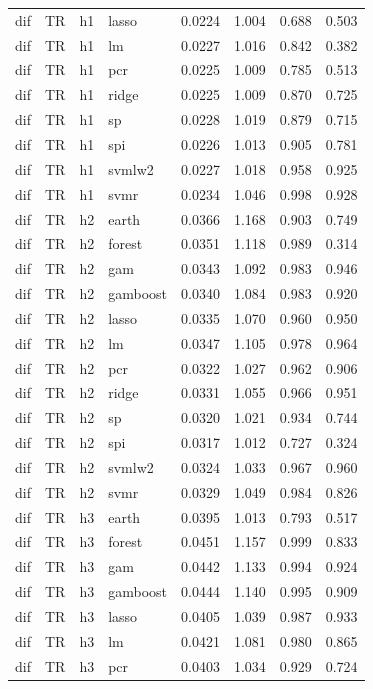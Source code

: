\begin{ThreePartTable}
\begin{longtable}[t]{llclcccc}
dif & TR & h1 & lasso & 0.0224 & 1.004 & 0.688 & 0.503\\
dif & TR & h1 & lm & 0.0227 & 1.016 & 0.842 & 0.382\\
dif & TR & h1 & pcr & 0.0225 & 1.009 & 0.785 & 0.513\\
dif & TR & h1 & ridge & 0.0225 & 1.009 & 0.870 & 0.725\\
dif & TR & h1 & sp & 0.0228 & 1.019 & 0.879 & 0.715\\
dif & TR & h1 & spi & 0.0226 & 1.013 & 0.905 & 0.781\\
dif & TR & h1 & svmlw2 & 0.0227 & 1.018 & 0.958 & 0.925\\
dif & TR & h1 & svmr & 0.0234 & 1.046 & 0.998 & 0.928\\
\addlinespace
dif & TR & h2 & earth & 0.0366 & 1.168 & 0.903 & 0.749\\
dif & TR & h2 & forest & 0.0351 & 1.118 & 0.989 & 0.314\\
dif & TR & h2 & gam & 0.0343 & 1.092 & 0.983 & 0.946\\
dif & TR & h2 & gamboost & 0.0340 & 1.084 & 0.983 & 0.920\\
dif & TR & h2 & lasso & 0.0335 & 1.070 & 0.960 & 0.950\\
dif & TR & h2 & lm & 0.0347 & 1.105 & 0.978 & 0.964\\
dif & TR & h2 & pcr & 0.0322 & 1.027 & 0.962 & 0.906\\
dif & TR & h2 & ridge & 0.0331 & 1.055 & 0.966 & 0.951\\
dif & TR & h2 & sp & 0.0320 & 1.021 & 0.934 & 0.744\\
dif & TR & h2 & spi & 0.0317 & 1.012 & 0.727 & 0.324\\
dif & TR & h2 & svmlw2 & 0.0324 & 1.033 & 0.967 & 0.960\\
dif & TR & h2 & svmr & 0.0329 & 1.049 & 0.984 & 0.826\\
\addlinespace
dif & TR & h3 & earth & 0.0395 & 1.013 & 0.793 & 0.517\\
dif & TR & h3 & forest & 0.0451 & 1.157 & 0.999 & 0.833\\
dif & TR & h3 & gam & 0.0442 & 1.133 & 0.994 & 0.924\\
dif & TR & h3 & gamboost & 0.0444 & 1.140 & 0.995 & 0.909\\
dif & TR & h3 & lasso & 0.0405 & 1.039 & 0.987 & 0.933\\
dif & TR & h3 & lm & 0.0421 & 1.081 & 0.980 & 0.865\\
dif & TR & h3 & pcr & 0.0403 & 1.034 & 0.929 & 0.724\\

\end{longtable}
\end{ThreePartTable}
